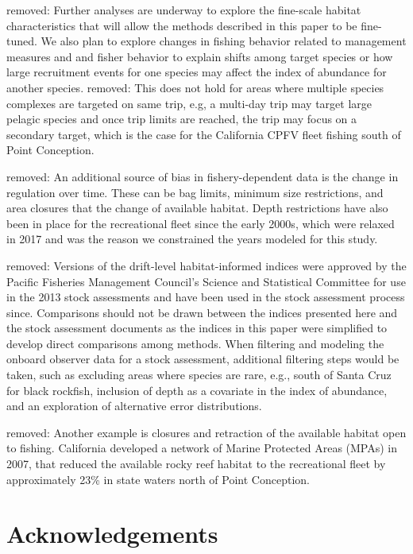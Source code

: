 \documentclass[
  12pt,
  authoryear,
  preprint,
  3p]{elsarticle}
\begin{document}
removed: Further analyses are underway to explore the fine-scale habitat
characteristics that will allow the methods described in this paper to
be fine-tuned. We also plan to explore changes in fishing behavior
related to management measures and and fisher behavior to explain shifts
among target species or how large recruitment events for one species may
affect the index of abundance for another species. removed: This does
not hold for areas where multiple species complexes are targeted on same
trip, e.g, a multi-day trip may target large pelagic species and once
trip limits are reached, the trip may focus on a secondary target, which
is the case for the California CPFV fleet fishing south of Point
Conception.

removed: An additional source of bias in fishery-dependent data is the
change in regulation over time. These can be bag limits, minimum size
restrictions, and area closures that the change of available habitat.
Depth restrictions have also been in place for the recreational fleet
since the early 2000s, which were relaxed in 2017 and was the reason we
constrained the years modeled for this study.

removed: Versions of the drift-level habitat-informed indices were
approved by the Pacific Fisheries Management Council's Science and
Statistical Committee for use in the 2013 stock assessments and have
been used in the stock assessment process since. Comparisons should not
be drawn between the indices presented here and the stock assessment
documents as the indices in this paper were simplified to develop direct
comparisons among methods. When filtering and modeling the onboard
observer data for a stock assessment, additional filtering steps would
be taken, such as excluding areas where species are rare, e.g., south of
Santa Cruz for black rockfish, inclusion of depth as a covariate in the
index of abundance, and an exploration of alternative error
distributions.

removed: Another example is closures and retraction of the available
habitat open to fishing. California developed a network of Marine
Protected Areas (MPAs) in 2007, that reduced the available rocky reef
habitat to the recreational fleet by approximately 23\% in state waters
north of Point Conception.

\hypertarget{acknowledgements}{%
\section{Acknowledgements}\label{acknowledgements}}
\end{document}
